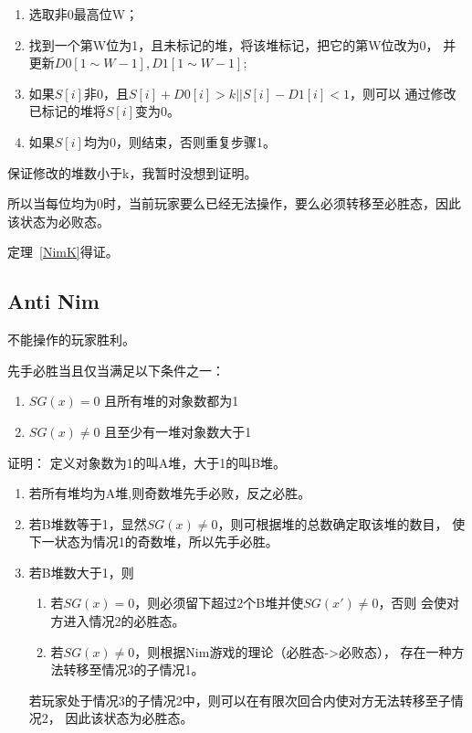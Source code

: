 \begin{enumerate}
	\item 选取非0最高位W；
	\item 找到一个第W位为1，且未标记的堆，将该堆标记，把它的第W位改为0，
	并更新$D0[1\sim W-1],D1[1\sim W-1]$;
	\item 如果$S[i]$非0，且$S[i]+D0[i]>k || S[i]-D1[i]<1$，则可以
	通过修改已标记的堆将$S[i]$变为0。
	\item 如果$S[i]$均为0，则结束，否则重复步骤1。
\end{enumerate}

保证修改的堆数小于k，我暂时没想到证明。

所以当每位均为0时，当前玩家要么已经无法操作，要么必须转移至必胜态，因此该状态为必败态。

定理~\ref{NimK}得证。

\subsection{Anti Nim}


不能操作的玩家胜利。

\begin{theorem}\label{AntiNim}
	先手必胜当且仅当满足以下条件之一：
	\begin{enumerate}
		\item $SG(x)=0$ 且所有堆的对象数都为1
		\item $SG(x)\not=0$ 且至少有一堆对象数大于1
	\end{enumerate}

\end{theorem}

证明：
定义对象数为1的叫A堆，大于1的叫B堆。

\begin{enumerate}
	\item 若所有堆均为A堆,则奇数堆先手必败，反之必胜。
	\item 若B堆数等于1，显然$SG(x)\not=0$，则可根据堆的总数确定取该堆的数目，
	      使下一状态为情况1的奇数堆，所以先手必胜。
	\item 若B堆数大于1，则
	      \begin{enumerate}
			  \item 若$SG(x)=0$，则必须留下超过2个B堆并使$SG(x')\not=0$，否则
			  会使对方进入情况2的必胜态。
			  \item 若$SG(x)\not=0$，则根据Nim游戏的理论（必胜态->必败态），
			  存在一种方法转移至情况3的子情况1。
	      \end{enumerate}
	      若玩家处于情况3的子情况2中，则可以在有限次回合内使对方无法转移至子情况2，
	      因此该状态为必胜态。
\end{enumerate}

